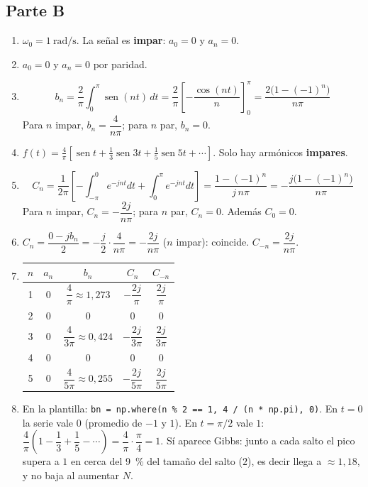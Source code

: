 \documentclass[11pt,a4paper]{article}
\DeclareMathOperator{\sen}{sen}
\newcommand{\py}[1]{\texttt{#1}}
\begin{document}
\subsection*{Parte B}
\begin{enumerate}[label=\textbf{Paso \arabic*.},leftmargin=*,labelsep=0.6em]
    \item $\omega_0=\qty{1}{\radian\per\second}$. La señal es \textbf{impar}: $a_0=0$ y $a_n=0$.
    \item $a_0=0$ y $a_n=0$ por paridad.
    \item
          \begin{equation*}
            b_n=\frac{2}{\pi}\int_{0}^{\pi}\sen(nt)\,dt
            =\frac{2}{\pi}\left[-\frac{\cos(nt)}{n}\right]_{0}^{\pi}
            =\frac{2\big(1-(-1)^{n}\big)}{n\pi}
          \end{equation*}
          Para $n$ impar, $b_n=\dfrac{4}{n\pi}$; para $n$ par, $b_n=0$.
    \item $\displaystyle f(t)=\frac{4}{\pi}\left[\sen t+\frac{1}{3}\sen3t+\frac{1}{5}\sen5t+\cdots\right]$.
          Solo hay armónicos \textbf{impares}.
    \item
          \begin{equation*}
            C_n=\frac{1}{2\pi}\left[-\int_{-\pi}^{0}e^{-jnt}dt+\int_{0}^{\pi}e^{-jnt}dt\right]
            =\frac{1-(-1)^{n}}{j\,n\pi}=-\frac{j\big(1-(-1)^{n}\big)}{n\pi}
          \end{equation*}
          Para $n$ impar, $C_n=-\dfrac{2j}{n\pi}$; para $n$ par, $C_n=0$. Además $C_0=0$.
    \item $C_n=\dfrac{0-jb_n}{2}=-\dfrac{j}{2}\cdot\dfrac{4}{n\pi}=-\dfrac{2j}{n\pi}$ ($n$ impar):
          coincide. $C_{-n}=\dfrac{2j}{n\pi}$.
    \item
          \begin{center}
          \small\renewcommand{\arraystretch}{1.35}
          \begin{tabular}{ccccc}
          \toprule
          $n$ & $a_n$ & $b_n$ & $C_n$ & $C_{-n}$\\
          \midrule
          1 & 0 & $\dfrac{4}{\pi}\approx1{,}273$ & $-\dfrac{2j}{\pi}$ & $\dfrac{2j}{\pi}$\\
          2 & 0 & 0 & 0 & 0\\
          3 & 0 & $\dfrac{4}{3\pi}\approx0{,}424$ & $-\dfrac{2j}{3\pi}$ & $\dfrac{2j}{3\pi}$\\
          4 & 0 & 0 & 0 & 0\\
          5 & 0 & $\dfrac{4}{5\pi}\approx0{,}255$ & $-\dfrac{2j}{5\pi}$ & $\dfrac{2j}{5\pi}$\\
          \bottomrule
          \end{tabular}
          \end{center}
    \item En la plantilla: \py{bn = np.where(n \% 2 == 1, 4 / (n * np.pi), 0)}. En $t=0$ la
          serie vale $0$ (promedio de $-1$ y $1$). En $t=\pi/2$ vale $1$:
          $\dfrac{4}{\pi}\left(1-\dfrac{1}{3}+\dfrac{1}{5}-\cdots\right)=\dfrac{4}{\pi}\cdot\dfrac{\pi}{4}=1$.
          Sí aparece Gibbs: junto a cada salto el pico supera a $1$ en cerca del
          9~\% del tamaño del salto ($2$), es decir llega a $\approx1{,}18$, y no baja al
          aumentar $N$.
\end{enumerate}
\end{document}
